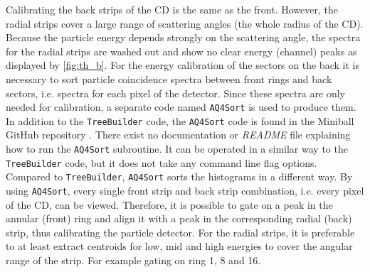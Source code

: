 \documentclass[twoside,english]{uiofysmaster/uiofysmaster}
\let\orgautoref\autoref
\renewcommand{\autoref}
        {%
		 \def\sectionautorefname{Section}%
		 \def\subsectionautorefname{Section}%
		 \def\subsubsectionautorefname{Section}%
		 \def\chapterautorefname{Chapter}%
          \orgautoref}
\begin{document}
Calibrating the back strips of the CD is the same as the front.
However, the radial strips cover a large range of scattering angles (the whole radius of the CD). 
Because the particle energy depends strongly on the scattering angle, the spectra for the radial strips are washed out and show no clear energy (channel) peaks as displayed by \autoref{fig:th_b}.
For the energy calibration of the sectors on the back it is necessary to sort particle coincidence spectra between front rings and back sectors, i.e. spectra for each pixel of the detector.
Since these spectra are only needed for calibration, a separate code named \texttt{AQ4Sort} is used to produce them.
In addition to the \texttt{TreeBuilder} code, the \texttt{AQ4Sort} code is found in the Miniball GitHub repository \cite{MBCS}.
There exist no documentation or \textit{README} file explaining how to run the \texttt{AQ4Sort} subroutine. 
It can be operated in a similar way to the \texttt{TreeBuilder} code, but it does not take any command line flag options.
Compared to \texttt{TreeBuilder}, \texttt{AQ4Sort} sorts the histograms in a different way.
By using \texttt{AQ4Sort}, every single front strip and back strip combination, i.e. every pixel of the CD, can be viewed. 
Therefore, it is possible to gate on a peak in the annular (front) ring and align it with a peak in the corresponding radial (back) strip, thus calibrating the particle detector. 
For the radial strips, it is preferable to at least extract centroids for low, mid and high energies to cover the angular range of the strip. 
For example gating on ring 1, 8 and 16. 
\end{document}
